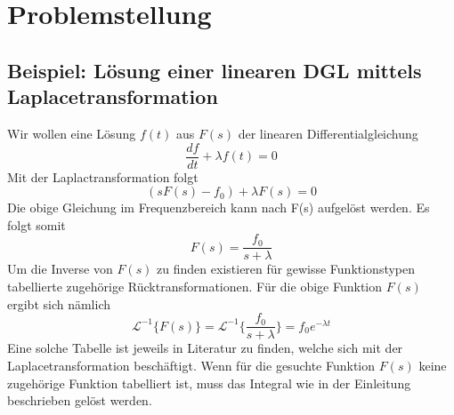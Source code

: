 %
%
%



\section{Problemstellung
\label{laplace:section:problemstellung}}
\subsection{Beispiel: Lösung einer linearen DGL mittels Laplacetransformation}
Wir wollen eine Lösung $f(t)$ aus $F(s)$ der linearen Differentialgleichung 
\[
\frac{df}{dt} + \lambda f(t) = 0
\]
Mit der Laplactransformation folgt
\[
(sF(s) - f_{0}) + \lambda F(s) = 0
\]
Die obige Gleichung im Frequenzbereich kann nach F(s) aufgelöst werden.
Es folgt somit
\[
F(s) = \frac{f_{0}}{s + \lambda}
\]
Um die Inverse von $F(s)$ zu finden existieren für gewisse Funktionstypen tabellierte zugehörige Rücktransformationen.
Für die obige Funktion $F(s)$ ergibt sich nämlich
\[
\mathcal{L}^{-1}\{F(s)\}=\mathcal{L}^{-1}\{\frac{f_{0}}{s+\lambda}\} = f_{0}e^{-\lambda t}
\]
Eine solche Tabelle ist jeweils in Literatur zu finden, welche sich mit der Laplacetransformation beschäftigt.
Wenn für die gesuchte Funktion $F(s)$ keine zugehörige Funktion tabelliert ist, muss das Integral wie in der Einleitung beschrieben gelöst werden.

